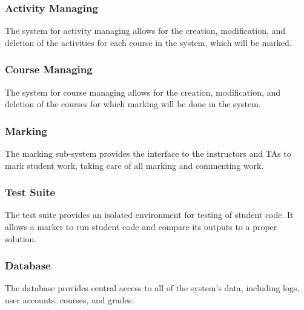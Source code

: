 \documentclass{article}
\begin{document}
\subsubsection{Activity Managing}
The system for activity managing allows for the creation, modification, and deletion
of the activities for each course in the system, which will be marked.
\subsubsection{Course Managing}
The system for course managing allows for the creation, modification, and deletion
of the courses for which marking will be done in the system.
\subsubsection{Marking}
The marking sub-system provides the interface to the instructors and TAs to mark
student work, taking care of all marking and commenting work.
\subsubsection{Test Suite}
The test suite provides an isolated environment for testing of student code. It allows a
marker to run student code and compare its outputs to a proper solution.
\subsubsection{Database}
The database provides central access to all of the system's data, including logs,
user accounts, courses, and grades.
\end{document}
